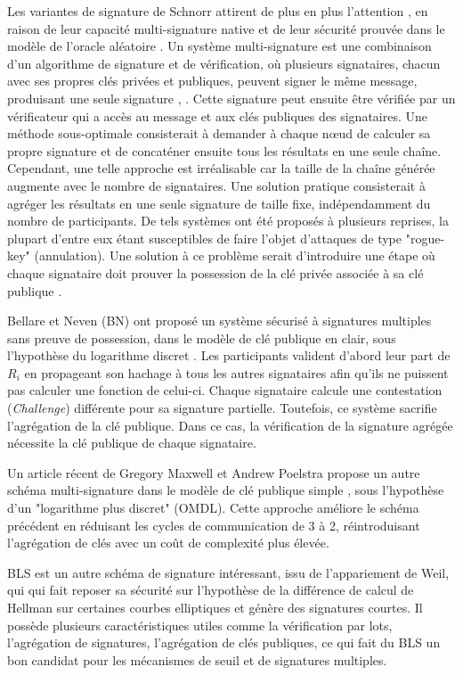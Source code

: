 \documentclass[journal]{IEEEtran}
\begin{document}
Les variantes de signature de Schnorr attirent de plus en plus l'attention \cite{8}, \cite{30} en raison de leur capacité multi-signature native et de leur sécurité prouvée dans le modèle de l'oracle aléatoire \cite{31}. Un système multi-signature est une combinaison d'un algorithme de signature et de vérification, où plusieurs signataires, chacun avec ses propres clés privées et publiques, peuvent signer le même message, produisant une seule signature \cite{32},  \cite{33} . Cette signature peut ensuite être vérifiée par un vérificateur qui a accès au message et aux clés publiques des signataires. Une méthode sous-optimale consisterait à demander à chaque nœud de calculer sa propre signature et de concaténer ensuite tous les résultats en une seule chaîne. Cependant, une telle approche est irréalisable car la taille de la chaîne générée augmente avec le nombre de signataires. Une solution pratique consisterait à agréger les résultats en une seule signature de taille fixe, indépendamment du nombre de participants. De tels systèmes ont été proposés à plusieurs reprises, la plupart d'entre eux étant susceptibles de faire l'objet d'attaques de type "rogue-key" (annulation). Une solution à ce problème serait d'introduire une étape où chaque signataire doit prouver la possession de la clé privée associée à sa clé publique \cite{34}.

Bellare et Neven \cite{35} (BN) ont proposé un système sécurisé à signatures multiples sans preuve de possession, dans le modèle de clé publique en clair, sous l'hypothèse du logarithme discret \cite{31}. Les participants valident d’abord leur part de ${R}_{i}$ en propageant son hachage à tous les autres signataires afin qu'ils ne puissent pas calculer une fonction de celui-ci. Chaque signataire calcule une contestation (\textit{Challenge}) différente pour sa signature partielle. Toutefois, ce système sacrifie l'agrégation de la clé publique. Dans ce cas, la vérification de la signature agrégée nécessite la clé publique de chaque signataire. 

Un article récent de Gregory Maxwell et Andrew Poelstra \cite{30} propose un autre schéma multi-signature dans le modèle de clé publique simple \cite{36}, sous l'hypothèse d'un "logarithme plus discret" (OMDL). Cette approche améliore le schéma précédent \cite{35} en réduisant les cycles de communication de 3 à 2, réintroduisant l'agrégation de clés avec un coût de complexité plus élevée.

BLS \cite{4} est un autre schéma de signature intéressant, issu de l’appariement  de Weil, qui qui fait reposer sa sécurité sur l'hypothèse de la différence de calcul de Hellman sur certaines courbes elliptiques et génère des signatures courtes. Il possède plusieurs caractéristiques utiles comme la vérification par lots, l'agrégation de signatures, l'agrégation de clés publiques, ce qui fait du BLS un bon candidat pour les mécanismes de seuil et de signatures multiples.
\end{document}
